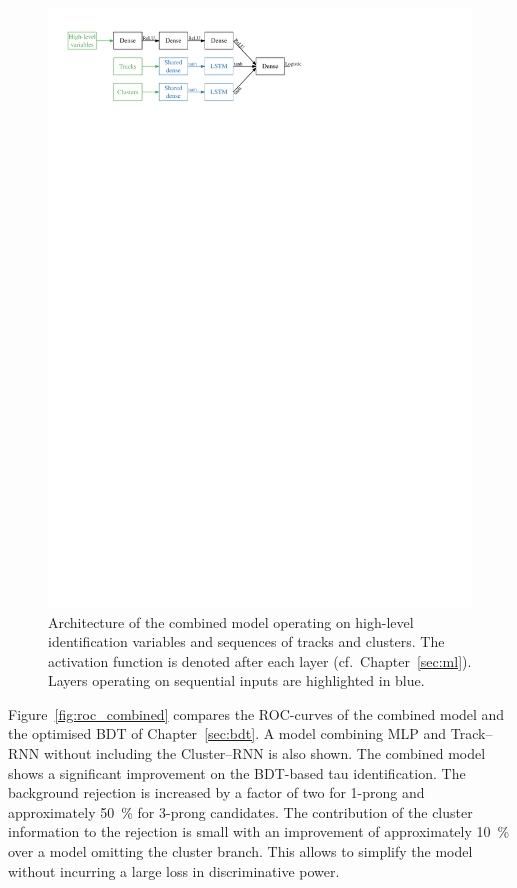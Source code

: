 \begin{figure}[htb]
  \centering
  \includegraphics{./figures/rnn/combined_architecture.pdf}
  \caption{Architecture of the combined model operating on high-level
    identification variables and sequences of tracks and clusters. The
    activation function is denoted after each layer (cf.\ Chapter~\ref{sec:ml}).
    Layers operating on sequential inputs are highlighted in blue.}
  \label{fig:schematic_combined}
\end{figure}

Figure~\ref{fig:roc_combined} compares the ROC-curves of the combined model and
the optimised BDT of Chapter~\ref{sec:bdt}. A model combining MLP and Track--RNN
without including the Cluster--RNN is also shown. The combined model shows a
significant improvement on the BDT-based tau identification. The background
rejection is increased by a factor of two for 1-prong and approximately
\SI{50}{\percent} for 3-prong candidates. The contribution of the cluster
information to the rejection is small with an improvement of approximately
\SI{10}{\percent} over a model omitting the cluster branch. This allows to
simplify the model without incurring a large loss in discriminative power.

